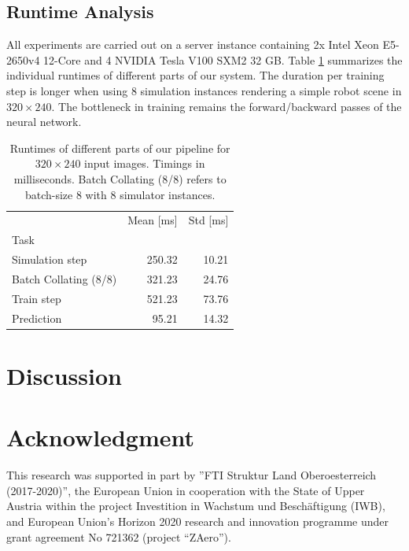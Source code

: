 \documentclass[conference]{IEEEtran}
\begin{document}
    \subsection{Runtime Analysis}
    All experiments are carried out on a server instance containing 2x Intel Xeon E5-2650v4 12-Core and 4 NVIDIA Tesla V100 SXM2 32 GB. Table \ref{tab:runtime} summarizes the individual runtimes of different parts of our system. The duration per training step is longer when using 8 simulation instances rendering a simple robot scene in $320 \times 240$. The bottleneck in training remains the forward/backward passes of the neural network.

    \begin{table}
        \centering
        \begin{tabular}{lrr}
            \toprule
            {} &  Mean [ms] &  Std [ms] \\
            Task                   &            &           \\
            \midrule
            Simulation step        &      250.32 &    10.21  \\
            Batch Collating (8/8)  &      321.23 &    24.76  \\
            Train step             &      521.23 &   73.76  \\
            Prediction             &      95.21 &    14.32 \\
            \bottomrule
        \end{tabular}
        \caption{
            \label{tab:runtime} 
            Runtimes of different parts of our pipeline for $320 \times 240$ input images. Timings in milliseconds. Batch Collating (8/8) refers to batch-size 8 with 8 simulator instances.
        }
    \end{table}

\section{Discussion}


\section*{Acknowledgment}
This research was supported in part by ”FTI Struktur Land Oberoesterreich (2017-2020)”, the European Union in cooperation with the State of Upper Austria within the project Investition in Wachstum und Beschäftigung (IWB), and European Union’s Horizon 2020 research and innovation programme under grant agreement No 721362 (project “ZAero”).

\small


\end{document}
